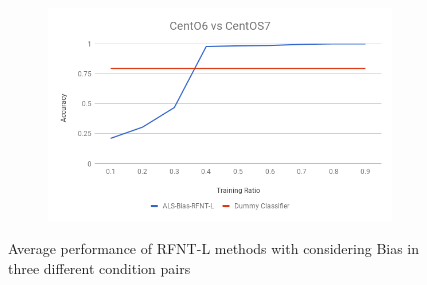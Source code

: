 \documentclass[10pt, conference, compsocconf]{IEEEtran}
\begin{document}
\begin{figure}[h!]
\begin{subfigure}[b]{0.8\linewidth}
                \includegraphics[width=\columnwidth]{figures/ALS-Bias/RFNT-L-ALS-Bias-6vs7-PFS}
        \end{subfigure}
        \caption{Average performance of RFNT-L methods  with considering Bias in three different condition pairs}
        \label{fig:RFNT-L method}
\end{figure}
\end{document}

